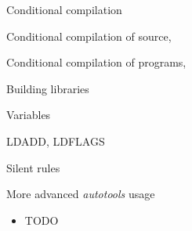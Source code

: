 \begin{frame}{Conditional compilation}

  Conditional compilation of source,

  Conditional compilation of programs,

\end{frame}

\begin{frame}{Building libraries}


\end{frame}

\begin{frame}{Variables}

LDADD, LDFLAGS

\end{frame}

\begin{frame}{Silent rules}


\end{frame}

\setuplabframe
{More advanced {\em autotools} usage}
{
  \begin{itemize}
  \item TODO
  \end{itemize}
}
